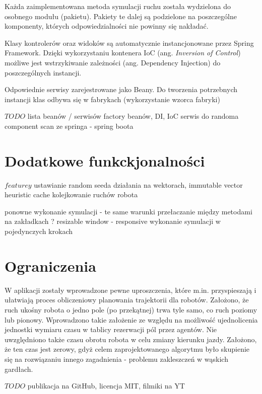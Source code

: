 Każda zaimplementowana metoda symulacji ruchu została wydzielona do osobnego modułu (pakietu). Pakiety te dalej są podzielone na poszczególne komponenty, których odpowiedzialności nie powinny się nakładać.

Klasy kontrolerów oraz widoków są automatycznie instancjonowane przez Spring Framework. Dzięki wykorzystaniu kontenera IoC (ang. {\it Inversion of Control}) możliwe jest wstrzykiwanie zależności (ang. {Dependency Injection}) do poszczególnych instancji.

Odpowiednie serwisy zarejestrowane jako Beany.
Do tworzenia potrzebnych instancji klas odbywa się w fabrykach (wykorzystanie wzorca fabryki)

$TODO$ lista beanów / serwisów
factory beanów, DI, IoC
serwis do randoma
component scan ze springa - spring boota

\section{Dodatkowe funkckjonalności}
$featurey$
ustawianie random seeda
działania na wektorach, immutable vector
heuristic cache
kolejkowanie ruchów robota

ponowne wykonanie symulacji - te same warunki
przełaczanie między metodami na zakładkach ?
resizable window - responsive
wykonanie symulacji w pojedynczych krokach

\section{Ograniczenia}
W aplikacji zostały wprowadzone pewne uproszczenia, które m.in. przyspieszają i ułatwiają proces obliczeniowy planowania trajektorii dla robotów.
Założono, że ruch ukośny robota o jedno pole (po przekątnej) trwa tyle samo, co ruch poziomy lub pionowy. Wprowadzono takie założenie ze względu na możliwość ujednolicenia jednostki wymiaru czasu w tablicy rezerwacji pól przez agentów.
Nie uwzględniono także czasu obrotu robota w celu zmiany kierunku jazdy. Założono, że ten czas jest zerowy, gdyż celem zaprojektowanego algorytmu było skupienie się na rozwiązaniu innego zagadnienia - problemu zakleszczeń w wąskich gardłach.

$TODO$ publikacja na GitHub, licencja MIT, filmiki na YT
